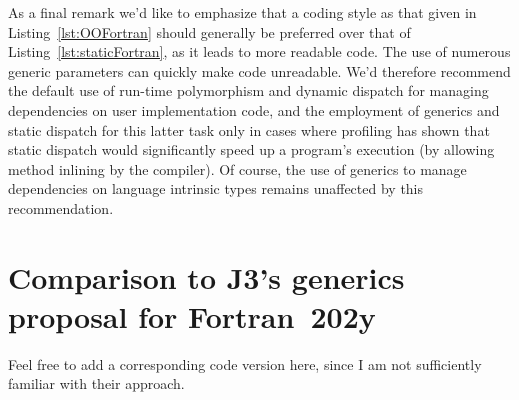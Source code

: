 \documentclass[11pt,oneside]{article}
\begin{document}
As a final remark we'd like to emphasize that a coding style as that
given in Listing~\ref{lst:OOFortran} should generally be preferred
over that of Listing~\ref{lst:staticFortran}, as it leads to more
readable code. The use of numerous generic parameters can quickly make
code unreadable. We'd therefore recommend the default use of run-time
polymorphism and dynamic dispatch for managing dependencies on user
implementation code, and the employment of generics and static
dispatch for this latter task only in cases where profiling has shown
that static dispatch would significantly speed up a program's
execution (by allowing method inlining by the compiler). Of course,
the use of generics to manage dependencies on language intrinsic types
remains unaffected by this recommendation.

\section{Comparison to J3's generics proposal for Fortran~202y}

{\sf Feel free to add a corresponding code version here,
since I am not sufficiently familiar with their approach.}




\end{document}
